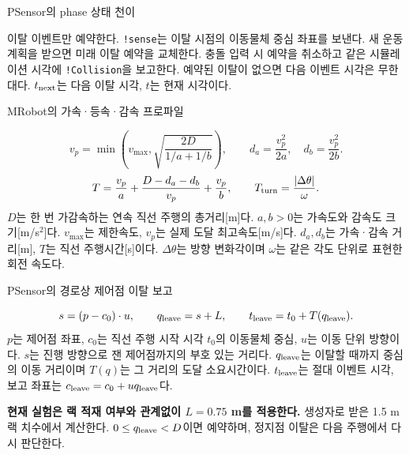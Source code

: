 \begin{frame}{PSensor의 phase 상태 천이}
\centering\resizebox{!}{4.2cm}{\PSensorDiagram}
\par\medskip\raggedright\small
이탈 이벤트만 예약한다. \texttt{!sense}는 이탈 시점의 이동물체 중심 좌표를 보낸다.
새 운동 계획을 받으면 미래 이탈 예약을 교체한다.
충돌 입력 시 예약을 취소하고 같은 시뮬레이션 시각에 \texttt{!Collision}을 보고한다.
예약된 이탈이 없으면 다음 이벤트 시각은 무한대다. $t_{\rm next}$는 다음 이탈 시각, $t$는 현재 시각이다.
\end{frame}

\begin{frame}{MRobot의 가속·등속·감속 프로파일}
\begin{center}\resizebox{.82\linewidth}{!}{\Profiles}\end{center}
\[
v_p=\min\!\left(v_{\max},\sqrt{\frac{2D}{1/a+1/b}}\right),
\qquad d_a=\frac{v_p^2}{2a},\quad d_b=\frac{v_p^2}{2b}.
\]
\[
T=\frac{v_p}{a}+\frac{D-d_a-d_b}{v_p}+\frac{v_p}{b},
\qquad T_{\rm turn}=\frac{|\Delta\theta|}{\omega}.
\]
\footnotesize
$D$는 한 번 가감속하는 연속 직선 주행의 총거리[m]다.
$a,b>0$는 가속도와 감속도 크기[m/s$^2$]다.
$v_{\max}$는 제한속도, $v_p$는 실제 도달 최고속도[m/s]다.
$d_a,d_b$는 가속·감속 거리[m], $T$는 직선 주행시간[s]이다.
$\Delta\theta$는 방향 변화각이며 $\omega$는 같은 각도 단위로 표현한 회전 속도다.
\end{frame}

\begin{frame}{PSensor의 경로상 제어점 이탈 보고}

\begin{center}
\end{center}

\[
s=(p-c_0)\cdot u,\qquad q_{\rm leave}=s+L,\qquad
t_{\rm leave}=t_0+T(q_{\rm leave}).
\]
\footnotesize
$p$는 제어점 좌표, $c_0$는 직선 주행 시작 시각 $t_0$의 이동물체 중심,
$u$는 이동 단위 방향이다. $s$는 진행 방향으로 잰 제어점까지의 부호 있는 거리다.
$q_{\rm leave}$는 이탈할 때까지 중심의 이동 거리이며 $T(q)$는 그 거리의 도달 소요시간이다.
$t_{\rm leave}$는 절대 이벤트 시각, 보고 좌표는 $c_{\rm leave}=c_0+u q_{\rm leave}$다.
\par\medskip
\textbf{현재 실험은 랙 적재 여부와 관계없이 $L=0.75$ m를 적용한다.}
생성자로 받은 1.5 m 랙 치수에서 계산한다.
$0\le q_{\rm leave}<D$이면 예약하며, 정지점 이탈은 다음 주행에서 다시 판단한다.

\end{frame}

